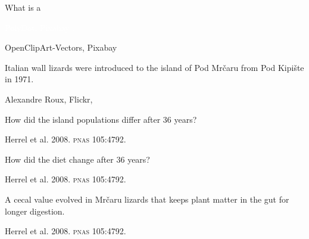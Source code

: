 \documentclass[t,handout]{beamer}  %
\begin{document}
%
{
\begin{frame}[b]{What is a }

\hfill \tiny \textcolor{white}{PolyDot, Pixabay .}
\end{frame}
}
%
{
\begin{frame}[b]

\hfill \tiny OpenClipArt-Vectors, Pixabay 
\end{frame}
}
%
{
\begin{frame}[b]{\strut Italian wall lizards were introduced to the island of Pod Mr\v{c}aru from Pod Kipi\v{s}te in 1971.}


\hfill\tiny Alexandre Roux, Flickr, 
\end{frame}
}
%
{
\begin{frame}
\end{frame}
}
%
{
\begin{frame}[b]{How did the island populations differ after 36 years?}

\hfill \tiny Herrel et al. 2008. \textsc{pnas} 105:4792.
\end{frame}
}
%
{
\begin{frame}[b]{How did the diet change after 36 years?}
	
\hfill \tiny Herrel et al. 2008. \textsc{pnas} 105:4792.
\end{frame}
}
%
{
	\begin{frame}[b]{A cecal value evolved in Mr\v{c}aru lizards that keeps plant matter in the gut for longer digestion.}
	
	\hfill \tiny Herrel et al. 2008. \textsc{pnas} 105:4792.
\end{frame}
}
%
%	
%
%
%
\end{document}
